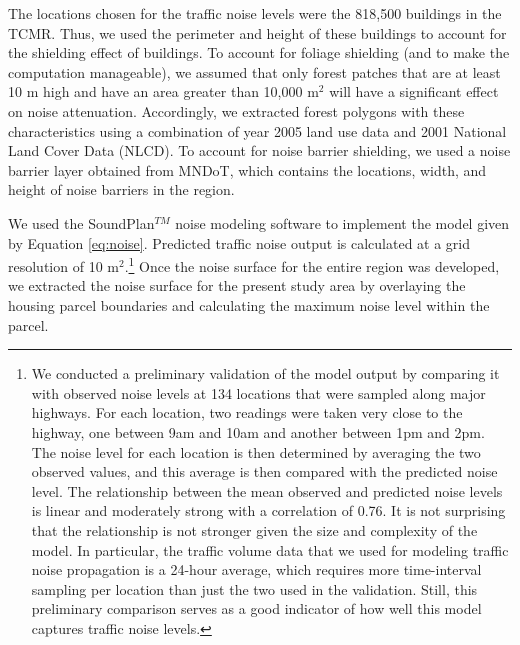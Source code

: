 \documentclass{article}\usepackage{graphicx, color}
\begin{document}
The locations chosen for the traffic noise levels were the 818,500 buildings in the TCMR. Thus, we used the perimeter and height of these buildings to account for the shielding effect of buildings. To account for foliage shielding (and to make the computation manageable), we assumed that only forest patches that are at least 10 m high and have an area greater than 10,000 m$^2$ will have a significant effect on noise attenuation. Accordingly, we extracted forest polygons with these characteristics using a combination of year 2005 land use data and 2001 National Land Cover Data (NLCD). To account for noise barrier shielding, we used a noise barrier layer obtained from MNDoT, which contains the locations, width, and height of noise barriers in the region.

We used the SoundPlan$^{TM}$ noise modeling software to implement the model given by Equation \ref{eq:noise}. Predicted traffic noise output is calculated at a grid resolution of 10 m$^2$.\footnote{We conducted a preliminary validation of the model output by comparing it with observed noise levels at 134 locations that were sampled along major highways. For each location, two readings were taken very close to the highway, one between 9am and 10am and another between 1pm and 2pm. The noise level for each location is then determined by averaging the two observed values, and this average is then compared with the predicted noise level. The relationship between the mean observed and predicted noise levels is linear and moderately strong with a correlation of 0.76. It is not surprising that the relationship is not stronger given the size and complexity of the model. In particular, the traffic volume data that we used for modeling traffic noise propagation is a 24-hour average, which requires more time-interval sampling per location than just the two used in the validation. Still, this preliminary comparison serves as a good indicator of how well this model captures traffic noise levels.} Once the noise surface for the entire region was developed, we extracted the noise surface for the present study area by overlaying the housing parcel boundaries and calculating the maximum noise level within the parcel.
\end{document}
